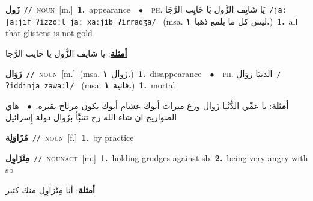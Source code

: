 \documentclass[10pt,a4paper,twoside]{article} %
\begin{document}
\begin{multicols}{2}
{\setlength\topsep{0pt}\textbf{\foreignlanguage{arabic}{زَول}}\ {\color{gray}\texttt{//}\color{black}}\ \textsc{noun}\ [m.]\ \textbf{1.}~appearance\ \ $\bullet$\ \ \textsc{ph.} \color{gray} \foreignlanguage{arabic}{يَا شَايِف الزَّول يَا خَايِب الرَّجَا}\color{black}\ {\color{gray}\texttt{/{\sffamily jaː ʃaːjif ʔizzoːl jaː xaːjib ʔirradʒa}/}\color{black}}\ \color{gray} (msa. \foreignlanguage{arabic}{ليس كل ما يلمع ذهبا}~\foreignlanguage{arabic}{\textbf{١.}})\color{black}\ \textbf{1.}~all that glistens is not gold\  \begin{flushright}\color{gray}\foreignlanguage{arabic}{\textbf{\underline{\foreignlanguage{arabic}{أمثلة}}}: يا شايف الزُّول يا خايب الرَّجا}\end{flushright}\color{black}} \vspace{2mm}

{\setlength\topsep{0pt}\textbf{\foreignlanguage{arabic}{زَوَال}}\ {\color{gray}\texttt{//}\color{black}}\ \textsc{noun}\ [m.]\ \color{gray}(msa. \foreignlanguage{arabic}{زَوال}~\foreignlanguage{arabic}{\textbf{١.}})\color{black}\ \textbf{1.}~disappearance\ \ $\bullet$\ \ \textsc{ph.} \color{gray} \foreignlanguage{arabic}{الدنيَا زوَال}\color{black}\ {\color{gray}\texttt{/{\sffamily ʔiddinja zawaːl}/}\color{black}}\ \color{gray} (msa. \foreignlanguage{arabic}{فانية}~\foreignlanguage{arabic}{\textbf{١.}})\color{black}\ \textbf{1.}~mortal\  \begin{flushright}\color{gray}\foreignlanguage{arabic}{\textbf{\underline{\foreignlanguage{arabic}{أمثلة}}}: يا عمِّي الدُّنْيا زَوال وزع ميراث أبوك عشام أبوك يكون مرتاح بقبره.\ $\bullet$\ \  هاي الصواريخ ان شاء الله رح تتنبَّأ بزَوال دولة إِسرائيل}\end{flushright}\color{black}} \vspace{2mm}

{\setlength\topsep{0pt}\textbf{\foreignlanguage{arabic}{مُزَاوَلِة}}\ {\color{gray}\texttt{//}\color{black}}\ \textsc{noun}\ [f.]\ \textbf{1.}~by practice\ } \vspace{2mm}

{\setlength\topsep{0pt}\textbf{\foreignlanguage{arabic}{مِتْزَاوِل}}\ {\color{gray}\texttt{//}\color{black}}\ \textsc{noun\textunderscore act}\ [m.]\ \textbf{1.}~holding grudges against sb.  \textbf{2.}~being very angry with sb\  \begin{flushright}\color{gray}\foreignlanguage{arabic}{\textbf{\underline{\foreignlanguage{arabic}{أمثلة}}}: أنا مِتْزاوِل منك كثير}\end{flushright}\color{black}} \vspace{2mm}


\end{multicols}
\end{document}
